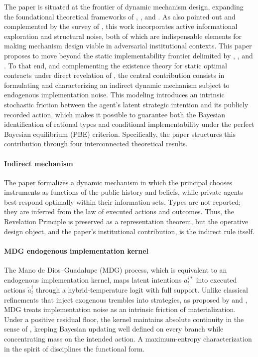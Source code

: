 \documentclass[review,authoryear,12pt]{elsarticle}
\theoremstyle{plain}
\theoremstyle{definition}
\newcommand{\1}{\mathbf{1}}
\begin{document}
The paper is situated at the frontier of dynamic mechanism design, expanding the foundational theoretical frameworks of \citet{CourtyLi2000}, \citet{EsoSzentes2007}, and \citet{PavanSegalToikka2014}. As also pointed out and complemented by the survey of \citet{BergemannValimaki2019}, this work incorporates active informational exploration and structural noise, both of which are indispensable elements for making mechanism design viable in adversarial institutional contexts. This paper proposes to move beyond the static implementability frontier delimited by \citet{MyersonSatterthwaite1983}, \citet{Rochet1987}, and \citet{RochetChone1998}. To that end, and complementing the existence theory for static optimal contracts under direct revelation of \citet{KadanRenySwinkels2017}, the central contribution consists in formulating and characterizing an indirect dynamic mechanism subject to endogenous implementation noise. This modeling introduces an intrinsic stochastic friction between the agent's latent strategic intention and its publicly recorded action, which makes it possible to guarantee both the Bayesian identification of rational types and conditional implementability under the perfect Bayesian equilibrium (PBE) criterion. Specifically, the paper structures this contribution through four interconnected theoretical results.

\paragraph{Indirect mechanism}
The paper formalizes a dynamic mechanism in which the principal chooses instruments as functions of the public history and beliefs, while private agents best-respond optimally within their information sets. Types are not reported; they are inferred from the law of executed actions and outcomes. Thus, the Revelation Principle is preserved as a representation theorem, but the operative design object, and the paper's institutional contribution, is the indirect rule itself.

\paragraph{MDG endogenous implementation kernel}
The Mano de Dios--Guadalupe (MDG) process, which is equivalent to an endogenous implementation kernel, maps latent intentions $a_t^{i\ast}$ into executed actions $\tilde a_t^i$ through a hybrid-temperature logit with full support. Unlike classical refinements that inject exogenous trembles into strategies, as proposed by \citet{Selten1975Perfectness} and \citet{KrepsWilson1982}, MDG treats implementation noise as an intrinsic friction of materialization. Under a positive residual floor, the kernel maintains absolute continuity in the sense of \citet{KalaiLehrer1993}, keeping Bayesian updating well defined on every branch while concentrating mass on the intended action. A maximum-entropy characterization in the spirit of \citet{Jaynes1957Information} disciplines the functional form.
\end{document}
